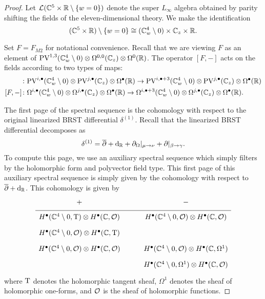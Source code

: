 \begin{proof}
Let $\mathcal L(\mathbb C^5 \times \mathbb R \setminus \{w=0\})$ denote the super $L_\infty$ algebra obtained by parity shifting the fields of the eleven-dimensional theory. 
We make the identification 
\[
(\mathbb C^5 \times \mathbb R) \setminus \{w=0\} \cong (\mathbb C_w^4 \setminus 0) \times \mathbb C_z \times \mathbb R .
\]

Set $F = F_{M2}$ for notational convenience. Recall that we are viewing $F$ as an element of ${\rm PV}^{1,3}(\mathbb C_w^4 \setminus 0) \otimes \Omega^{0,0}(\mathbb C_z) \otimes \Omega^0(\mathbb R)$. 
The operator $[F,-]$ acts on the fields according to two types of maps:
\begin{align*}
[F ,-] & \colon \PV^{i,\bu}(\CC^4_w \setminus 0) \otimes \PV^{j,\bu} (\CC_z) \otimes \Omega^\bu (\RR) \to \PV^{i,\bu+3}(\CC^4_w \setminus 0) \otimes \PV^{j,\bu} (\CC_z) \otimes \Omega^\bu (\RR) \\
[F,-] & \colon \Omega^{i,\bu}(\CC^4_w \setminus 0) \otimes \Omega^{j,\bu} (\CC_z) \otimes \Omega^\bu (\RR) \to \Omega^{i,\bu+3}(\CC^4_w \setminus 0) \otimes \Omega^{j,\bu} (\CC_z) \otimes \Omega^\bu (\RR).
\end{align*}



The first page of the spectral sequence is the cohomology with respect to the original linearized BRST differential $\delta^{(1)}$. 
Recall that the linearized BRST differential decomposes as
\[
\delta^{(1)} = \overline{\partial} + {\rm d}_{\mathbb R} + \partial_{\Omega} |_{\mu \to \nu} + \partial |_{\beta \to \gamma}  .
\]
To compute this page, we use an auxiliary spectral sequence which simply filters by the holomorphic form and polyvector field type. 
This first page of this auxiliary spectral sequence is simply given by the cohomology with respect to $\overline{\partial} + {\rm d}_{\mathbb R}$. 
This cohomology is given by
\begin{equation}
  \label{eqn:ads4ss} 
  \begin{tikzcd}[row sep = 1 ex]
    + & - \\ \hline
H^\bu(\CC^4\setminus 0, \T) \otimes H^\bu(\CC, \cO) & H^\bu(\CC^4 \setminus 0, \cO) \otimes H^\bu(\CC, \cO) \\
H^\bu(\CC^4\setminus 0, \cO) \otimes H^\bu(\CC, \T) \\
H^\bu(\CC^4\setminus 0, \cO) \otimes H^\bu(\CC, \cO) & H^\bu(\CC^4\setminus 0, \cO) \otimes H^\bu(\CC, \Omega^1) \\ & H^\bu(\CC^4\setminus 0, \Omega^1) \otimes H^\bu(\CC, \cO)  
\end{tikzcd}
\end{equation}
where ${\rm T}$ denotes the holomorphic tangent sheaf, $\Omega^1$ denotes the sheaf of holomorphic one-forms, and $\mathcal O$ is the sheaf of holomorphic functions.


\end{proof}

